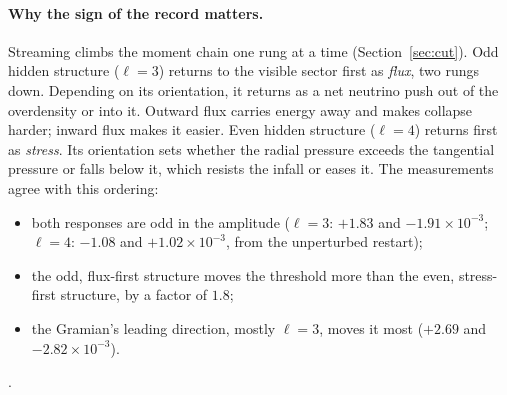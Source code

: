 \paragraph{Why the sign of the record matters.} Streaming climbs the moment chain one rung at a time (Section~\ref{sec:cut}). Odd hidden structure ($\ell=3$) returns to the visible sector first as \emph{flux}, two rungs down. Depending on its orientation, it returns as a net neutrino push out of the overdensity or into it. Outward flux carries energy away and makes collapse harder; inward flux makes it easier. Even hidden structure ($\ell=4$) returns first as \emph{stress}. Its orientation sets whether the radial pressure exceeds the tangential pressure or falls below it, which resists the infall or eases it. The measurements agree with this ordering:
\begin{itemize}
\item both responses are odd in the amplitude ($\ell=3$: $+1.83$ and $-1.91\times10^{-3}$; $\ell=4$: $-1.08$ and $+1.02\times10^{-3}$, from the unperturbed restart);
\item the odd, flux-first structure moves the threshold more than the even, stress-first structure, by a factor of $1.8$;
\item the Gramian's leading direction, mostly $\ell=3$, moves it most ($+2.69$ and $-2.82\times10^{-3}$).
\end{itemize}
.

